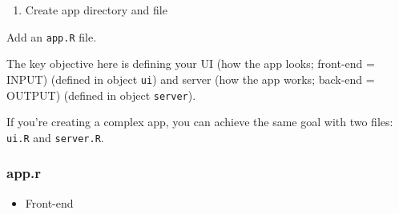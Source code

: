\documentclass[
]{book}
\providecommand{\tightlist}{%
  \setlength{\itemsep}{0pt}\setlength{\parskip}{0pt}}
\begin{document}
\begin{enumerate}
\def\labelenumi{\arabic{enumi}.}
\setcounter{enumi}{1}
\tightlist
\item
  Create app directory and file
\end{enumerate}

Add an \texttt{app.R} file.

The key objective here is defining your UI (how the app looks; front-end = INPUT) (defined in object \texttt{ui}) and server (how the app works; back-end = OUTPUT) (defined in object \texttt{server}).

If you're creating a complex app, you can achieve the same goal with two files: \texttt{ui.R} and \texttt{server.R}.

\hypertarget{app.r}{%
\subsubsection{app.r}\label{app.r}}

\begin{itemize}
\tightlist
\item
  Front-end
\end{itemize}
\end{document}
